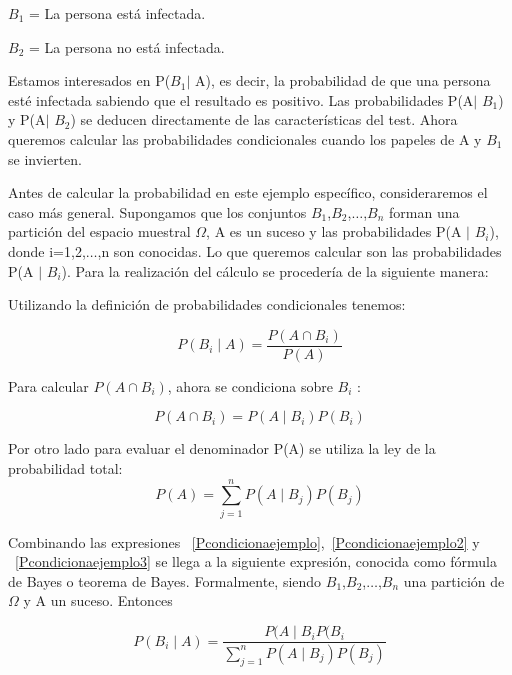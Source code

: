 \hspace{3.7cm}$B_1$ = La persona está infectada.

\hspace{3.7cm}$B_2$ = La persona no está infectada.

Estamos interesados en P($B_1$$\mid$ A), es decir, la probabilidad de que una persona esté infectada sabiendo que el resultado es positivo. Las probabilidades P(A$\mid$ $B_1$) y P(A$\mid$ $B_2$) se deducen directamente de las características del test. Ahora queremos calcular las probabilidades condicionales cuando los papeles de A y $B_1$ se invierten.

Antes de calcular la probabilidad en este ejemplo específico, consideraremos el caso más general. Supongamos que los conjuntos $B_1$,$B_2$,$\dots$,$B_n$ forman una partición del espacio muestral $\Omega$, A es un suceso y las probabilidades P(A $\mid$ $B_i$), donde i=1,2,$\dots$,n son conocidas. Lo que queremos calcular son las probabilidades P(A $\mid$ $B_i$). Para la realización del cálculo se procedería de la siguiente manera:

Utilizando la definición de probabilidades condicionales tenemos:

\begin{equation}\label{Pcondicionaejemplo}
P(B_i \mid A) = \frac{P(A \cap B_i)}{P(A)}
\end{equation}

Para calcular $P(A \cap B_i)$, ahora se condiciona sobre $B_i$ :

\begin{equation}\label{Pcondicionaejemplo2}
P(A \cap B_i) = P(A\mid B_{i})P(B_i)
\end{equation}

Por otro lado para evaluar el denominador P(A) se utiliza la ley de la probabilidad total:
\begin{equation}\label{Pcondicionaejemplo3}
P(A) = \sum_{j=1}^{n}P(A\mid B_{j})P(B_j)
\end{equation}

Combinando las expresiones ~\ref{Pcondicionaejemplo},~\ref{Pcondicionaejemplo2} y ~\ref{Pcondicionaejemplo3} se llega a la siguiente expresión, conocida como fórmula de Bayes o teorema de Bayes. Formalmente, siendo $B_{1}$,$B_{2}$,$\dots$,$B_n$ una partición de $\Omega$ y A un suceso. Entonces

\begin{equation}\label{Teoremadebayes}
P(B_{i}\mid A) = \frac{P(A \mid B_{i}P(B_{i}}{\sum_{j=1}^{n}P(A \mid B_{j})P(B_{j})}
\end{equation}

